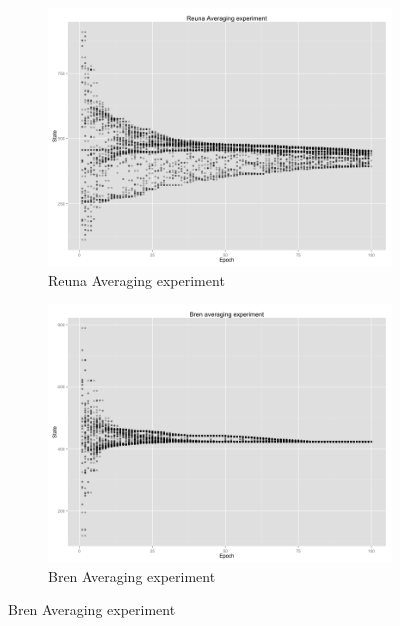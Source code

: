 \begin{figure}[h!]
	\centering
    \begin{subfigure}[t]{0.47\textwidth}
    \vspace{0pt}
    \includegraphics[width=\linewidth]{figures/Reuna.png}
    \caption{Reuna Averaging experiment}
    \end{subfigure}
    \begin{subfigure}[t]{0.47\textwidth}
    \vspace{0pt}
    \includegraphics[width=\linewidth]{figures/Bren.png}
    \caption{Bren Averaging experiment}
    \end{subfigure}
    \vspace{5ex}

\end{figure}
